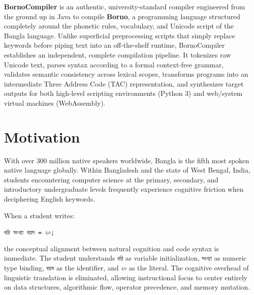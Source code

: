 \documentclass[12pt, a4paper]{report}
\begin{document}
\textbf{BornoCompiler} is an authentic, university-standard compiler engineered from the ground up in Java to compile \textbf{Borno}, a programming language structured completely around the phonetic rules, vocabulary, and Unicode script of the Bangla language. Unlike superficial preprocessing scripts that simply replace keywords before piping text into an off-the-shelf runtime, BornoCompiler establishes an independent, complete compilation pipeline. It tokenizes raw Unicode text, parses syntax according to a formal context-free grammar, validates semantic consistency across lexical scopes, transforms programs into an intermediate Three Address Code (TAC) representation, and synthesizes target outputs for both high-level scripting environments (Python 3) and web/system virtual machines (WebAssembly).

\section{Motivation}
With over 300 million native speakers worldwide, Bangla is the fifth most spoken native language globally. Within Bangladesh and the state of West Bengal, India, students encountering computer science at the primary, secondary, and introductory undergraduate levels frequently experience cognitive friction when deciphering English keywords.

When a student writes:
\begin{center}
\texttt{ধরি সংখ্যা বয়স = ২০;}
\end{center}
the conceptual alignment between natural cognition and code syntax is immediate. The student understands \texttt{ধরি} as variable initialization, \texttt{সংখ্যা} as numeric type binding, \texttt{বয়স} as the identifier, and \texttt{২০} as the literal. The cognitive overhead of linguistic translation is eliminated, allowing instructional focus to center entirely on data structures, algorithmic flow, operator precedence, and memory mutation.
\end{document}
